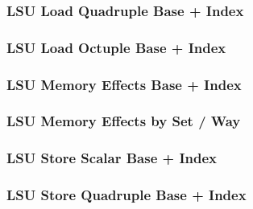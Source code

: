 \subsubsection[{\small LSU Load Quadruple Base + Index}]{LSU Load Quadruple Base + Index} \label{sec:format-LSU-LQBI}



\subsubsection[{\small LSU Load Octuple Base + Index}]{LSU Load Octuple Base + Index} \label{sec:format-LSU-LOBI}



\subsubsection[{\small LSU Memory Effects Base + Index}]{LSU Memory Effects Base + Index} \label{sec:format-LSU-FXBI}



\subsubsection[{\small LSU Memory Effects by Set / Way}]{LSU Memory Effects by Set / Way} \label{sec:format-LSU-FXSW}



\subsubsection[{\small LSU Store Scalar Base + Index}]{LSU Store Scalar Base + Index} \label{sec:format-LSU-SSBI}



\subsubsection[{\small LSU Store Quadruple Base + Index}]{LSU Store Quadruple Base + Index} \label{sec:format-LSU-SQBI}

